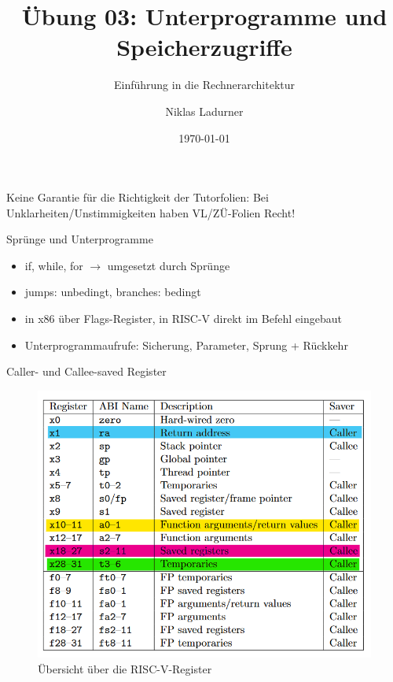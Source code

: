 \documentclass[
  german,            %
  aspectratio=169,    %
]{tumbeamer}
\title{Übung 03: Unterprogramme und \\ Speicherzugriffe}
\subtitle{Einführung in die Rechnerarchitektur}
\author{Niklas Ladurner}
\institute{\theChairName\\\theDepartmentName\\\theUniversityName}
\date[\today]{\today}
\begin{document}
\maketitle

\begin{frame}[c]{}{}
  \begin{center}
    \LARGE  Keine Garantie für die Richtigkeit der Tutorfolien: Bei Unklarheiten/Unstimmigkeiten 
    haben VL/ZÜ-Folien Recht!
  \end{center}
\end{frame}

\begin{frame}[c]{Sprünge und Unterprogramme}{}
  \begin{itemize}
    \item if, while, for $\rightarrow$ umgesetzt durch Sprünge
    \item jumps: unbedingt, branches: bedingt
    \item in x86 über Flags-Register, in RISC-V direkt im Befehl eingebaut
    \item Unterprogrammaufrufe: Sicherung, Parameter, Sprung + Rückkehr
  \end{itemize}
\end{frame}

\begin{frame}[c]{Caller- und Callee-saved Register}{}
  \begin{figure}[h]
  \includegraphics[height=0.75\textheight]{../resources/w03_calling_conv_regs.png}
  \caption{Übersicht über die RISC-V-Register}
  \end{figure}
\end{frame}
\end{document}
